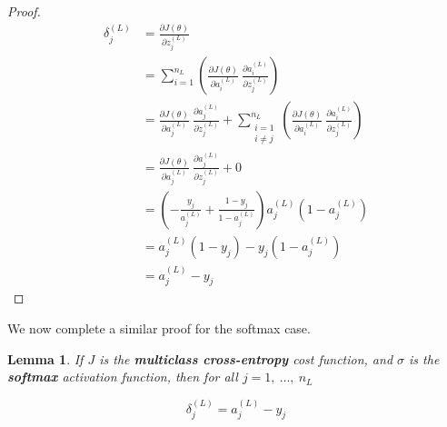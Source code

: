 \documentclass{article}[11pt]
\newtheorem{lemma}{Lemma}
\begin{document}
\begin{proof}
            $$ \begin{aligned}
            \delta^{(L)}_j &= \frac{\partial J(\theta)}{\partial z^{(L)}_j} \\
            &= \sum_{i=1}^{n_L} \left( \frac{\partial J(\theta)}{\partial a^{(L)}_i} \ \frac{\partial a^{(L)}_i}{\partial z^{(L)}_j} \right) \\
            &= \frac{\partial J(\theta)}{\partial a^{(L)}_j} \ \frac{\partial a^{(L)}_j}{\partial z^{(L)}_j} + \sum_{\substack{i=1 \\ i \neq j}}^{n_L} \left( \frac{\partial J(\theta)}{\partial a^{(L)}_i} \ \frac{\partial a^{(L)}_i}{\partial z^{(L)}_j} \right) \\
            &= \frac{\partial J(\theta)}{\partial a^{(L)}_j} \ \frac{\partial a^{(L)}_j}{\partial z^{(L)}_j} + 0 \\
            &= \left( - \frac{y_j}{a^{(L)}_j} + \frac{1 - y_j}{1 - a^{(L)}_j} \right) a^{(L)}_j \left( 1 - a^{(L)}_j \right) \\
            &= a^{(L)}_j (1 - y_j) - y_j (1 - a^{(L)}_j) \\
            &= a^{(L)}_j - y_j
            \end{aligned} $$
            
        \end{proof}
        
        
        We now complete a similar proof for the softmax case.
        
        
        \begin{lemma}
            
            If $J$ is the \textbf{multiclass cross-entropy} cost function, and $\sigma$ is the \textbf{softmax} activation function, then for all $j = 1, \ \ldots, \ n_L$
            
            $$
            \delta^{(L)}_j = a^{(L)}_j - y_j
            $$
            
        \end{lemma}
        
\end{document}
